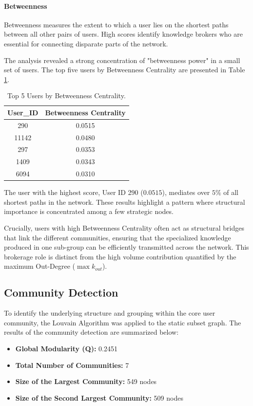 \documentclass[sigplan]{acmart}
\begin{document}
\paragraph{Betweenness}
Betweenness measures the extent to which a user lies on the shortest paths between all other pairs of users. High scores identify knowledge brokers who are essential for connecting disparate parts of the network.

The analysis revealed a strong concentration of "betweenness power" in a small set of users. The top five users by Betweenness Centrality are presented in Table \ref{tab:betweenness}.

\begin{table}[htbp]
\centering
\caption{Top 5 Users by Betweenness Centrality.}
\label{tab:betweenness}
\begin{tabular}{|c|c|}
\hline
\textbf{User\_ID} & \textbf{Betweenness Centrality} \\
\hline
290 & 0.0515 \\
\hline
11142 & 0.0480 \\
\hline
297 & 0.0353 \\
\hline
1409 & 0.0343 \\
\hline
6094 & 0.0310 \\
\hline
\end{tabular}
\end{table}

The user with the highest score, User ID 290 ($\mathbf{0.0515}$), mediates over $5\%$ of all shortest paths in the network. These results highlight a pattern where structural importance is concentrated among a few strategic nodes.


Crucially, users with high Betweenness Centrality often act as structural bridges that link the different communities, ensuring that the specialized knowledge produced in one sub-group can be efficiently transmitted across the network. This brokerage role is distinct from the high volume contribution quantified by the maximum Out-Degree ($\max k_{out}$).

\subsection{Community Detection}

To identify the underlying structure and grouping within the core user community, the Louvain Algorithm was applied to the static subset graph. The results of the community detection are summarized below:

\begin{itemize}
    \item \textbf{Global Modularity (Q):} 0.2451
    \item \textbf{Total Number of Communities:} 7
    \item \textbf{Size of the Largest Community:} 549 nodes
    \item \textbf{Size of the Second Largest Community:} 509 nodes
\end{itemize}
\end{document}
